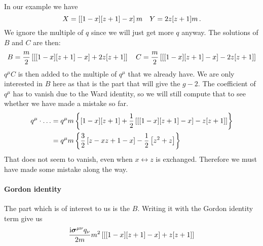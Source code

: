 \documentclass[11pt, english, fleqn, DIV=15, headinclude, BCOR=1cm]{scrartcl}
\begin{document}
In our example we have
\[
    X = \left[ [1 - x] [z + 1] - x \right] m
    \quad
    Y = 2 z [z+1] m \,.
\]
We ignore the multiple of $q$ since we will just get more $q$ anyway. The
solutions of $B$ and $C$ are then:
\[
    B = \frac m2 \left[ \left[ [1 - x] [z + 1] - x \right] + 2 z [z+1] \right]
    \quad
    C = \frac m2 \left[ \left[ [1 - x] [z + 1] - x \right] - 2 z [z+1] \right]
\]
$q^\mu C$ is then added to the multiple of $q^\mu$ that we already have. We are
only interested in $B$ here as that is the part that will give the $g-2$. The
coefficient of $q^\mu$ has to vanish due to the Ward identity, so we will still
compute that to see whether we have made a mistake so far.
\begin{align*}
    q^\mu \cdot \ldots
    &= q^\mu m \left\{ 
        [1 - x] [z + 1] + \frac 12 \left[ \left[ [1 - x] [z + 1] - x \right] - z [z+1] \right]
     \right\} \\
    &= q^\mu m \left\{ 
        \frac 32 \left[ z - xz + 1 - x \right] - \frac 12 \left[ z^2 + z \right]
     \right\}
\end{align*}
That does not seem to vanish, even when $x \leftrightarrow z$ is exchanged.
Therefore we must have made some mistake along the way.

\paragraph{Gordon identity}

The part which is of interest to us is the $B$. Writing it with the Gordon
identity term give us
\[
    \frac{\iup \mat\sigma^{\mu\nu} q_\nu}{2m}
    m^2 \sbr{\sbr{[1 - x] [z + 1] - x} + z [z+1]}
\]
\end{document}
